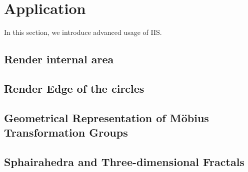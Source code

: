 
\section{Application}

In this section, we introduce advanced usage of IIS.

\subsection{Render internal area}


\subsection{Render Edge of the circles}


\subsection{Geometrical Representation of M\"obius Transformation Groups}


\subsection{Sphairahedra and Three-dimensional Fractals}

